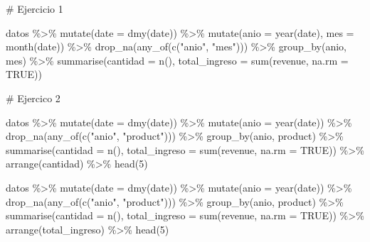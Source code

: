 \documentclass[
  letterpaper,
  DIV=11,
  numbers=noendperiod]{scrreprt}
\newenvironment{Shaded}{\begin{snugshade}}{\end{snugshade}}
\newcommand{\AttributeTok}[1]{\textcolor[rgb]{0.40,0.45,0.13}{#1}}
\newcommand{\CommentTok}[1]{\textcolor[rgb]{0.37,0.37,0.37}{#1}}
\newcommand{\ConstantTok}[1]{\textcolor[rgb]{0.56,0.35,0.01}{#1}}
\newcommand{\DecValTok}[1]{\textcolor[rgb]{0.68,0.00,0.00}{#1}}
\newcommand{\FunctionTok}[1]{\textcolor[rgb]{0.28,0.35,0.67}{#1}}
\newcommand{\NormalTok}[1]{\textcolor[rgb]{0.00,0.23,0.31}{#1}}
\newcommand{\SpecialCharTok}[1]{\textcolor[rgb]{0.37,0.37,0.37}{#1}}
\newcommand{\StringTok}[1]{\textcolor[rgb]{0.13,0.47,0.30}{#1}}
\begin{document}
\begin{Shaded}
\begin{Highlighting}[]
\CommentTok{\# Ejercicio 1}

\NormalTok{datos }\SpecialCharTok{\%\textgreater{}\%} 
  \FunctionTok{mutate}\NormalTok{(}\AttributeTok{date =} \FunctionTok{dmy}\NormalTok{(date)) }\SpecialCharTok{\%\textgreater{}\%} 
  \FunctionTok{mutate}\NormalTok{(}\AttributeTok{anio =} \FunctionTok{year}\NormalTok{(date), }\AttributeTok{mes =} \FunctionTok{month}\NormalTok{(date)) }\SpecialCharTok{\%\textgreater{}\%} 
  \FunctionTok{drop\_na}\NormalTok{(}\FunctionTok{any\_of}\NormalTok{(}\FunctionTok{c}\NormalTok{(}\StringTok{"anio"}\NormalTok{, }\StringTok{"mes"}\NormalTok{))) }\SpecialCharTok{\%\textgreater{}\%} 
  \FunctionTok{group\_by}\NormalTok{(anio, mes) }\SpecialCharTok{\%\textgreater{}\%} 
  \FunctionTok{summarise}\NormalTok{(}\AttributeTok{cantidad =} \FunctionTok{n}\NormalTok{(), }\AttributeTok{total\_ingreso =} \FunctionTok{sum}\NormalTok{(revenue, }\AttributeTok{na.rm =} \ConstantTok{TRUE}\NormalTok{))}

\CommentTok{\# Ejercico 2}

\NormalTok{datos }\SpecialCharTok{\%\textgreater{}\%} 
  \FunctionTok{mutate}\NormalTok{(}\AttributeTok{date =} \FunctionTok{dmy}\NormalTok{(date)) }\SpecialCharTok{\%\textgreater{}\%} 
  \FunctionTok{mutate}\NormalTok{(}\AttributeTok{anio =} \FunctionTok{year}\NormalTok{(date)) }\SpecialCharTok{\%\textgreater{}\%} 
  \FunctionTok{drop\_na}\NormalTok{(}\FunctionTok{any\_of}\NormalTok{(}\FunctionTok{c}\NormalTok{(}\StringTok{"anio"}\NormalTok{, }\StringTok{"product"}\NormalTok{))) }\SpecialCharTok{\%\textgreater{}\%} 
  \FunctionTok{group\_by}\NormalTok{(anio, product) }\SpecialCharTok{\%\textgreater{}\%} 
  \FunctionTok{summarise}\NormalTok{(}\AttributeTok{cantidad =} \FunctionTok{n}\NormalTok{(), }\AttributeTok{total\_ingreso =} \FunctionTok{sum}\NormalTok{(revenue, }\AttributeTok{na.rm =} \ConstantTok{TRUE}\NormalTok{)) }\SpecialCharTok{\%\textgreater{}\%}   \FunctionTok{arrange}\NormalTok{(cantidad) }\SpecialCharTok{\%\textgreater{}\%} 
  \FunctionTok{head}\NormalTok{(}\DecValTok{5}\NormalTok{)}

\NormalTok{datos }\SpecialCharTok{\%\textgreater{}\%} 
  \FunctionTok{mutate}\NormalTok{(}\AttributeTok{date =} \FunctionTok{dmy}\NormalTok{(date)) }\SpecialCharTok{\%\textgreater{}\%} 
  \FunctionTok{mutate}\NormalTok{(}\AttributeTok{anio =} \FunctionTok{year}\NormalTok{(date)) }\SpecialCharTok{\%\textgreater{}\%} 
  \FunctionTok{drop\_na}\NormalTok{(}\FunctionTok{any\_of}\NormalTok{(}\FunctionTok{c}\NormalTok{(}\StringTok{"anio"}\NormalTok{, }\StringTok{"product"}\NormalTok{))) }\SpecialCharTok{\%\textgreater{}\%} 
  \FunctionTok{group\_by}\NormalTok{(anio, product) }\SpecialCharTok{\%\textgreater{}\%} 
  \FunctionTok{summarise}\NormalTok{(}\AttributeTok{cantidad =} \FunctionTok{n}\NormalTok{(), }\AttributeTok{total\_ingreso =} \FunctionTok{sum}\NormalTok{(revenue, }\AttributeTok{na.rm =} \ConstantTok{TRUE}\NormalTok{)) }\SpecialCharTok{\%\textgreater{}\%}   \FunctionTok{arrange}\NormalTok{(total\_ingreso) }\SpecialCharTok{\%\textgreater{}\%} 
  \FunctionTok{head}\NormalTok{(}\DecValTok{5}\NormalTok{)}


\end{Highlighting}
\end{Shaded}
\end{document}
